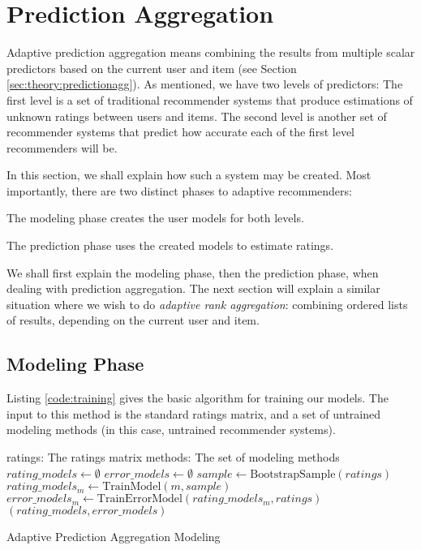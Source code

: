 \section{Prediction Aggregation}

Adaptive prediction aggregation means combining the results
from multiple scalar predictors based on the current user and item
(see Section \ref{sec:theory:predictionagg}).
As mentioned, we have two levels of predictors:
The first level is a set of traditional recommender systems
that produce estimations of unknown ratings between users and items.
The second level is another set of recommender systems 
that predict how accurate each of the first level recommenders will be.

In this section, we shall explain how such a system may be created.
Most importantly, there are two distinct phases to adaptive recommenders:

\begin{enumerate*}
  \item The modeling phase creates the user models for both levels.
  \item The prediction phase uses the created models to estimate ratings.
\end{enumerate*}

We shall first explain the modeling phase, then the prediction phase,
when dealing with prediction aggregation.
The next section will explain a similar situation where
we wish to do \emph{adaptive rank aggregation}: 
combining ordered lists of results, depending on the current user and item.


\subsection{Modeling Phase}

Listing \ref{code:training} gives the basic algorithm for training
our models. The input to this method is the standard ratings matrix,
and a set of untrained modeling methods (in this case,
untrained recommender systems).

\begin{algorithm}
  \begin{algorithmic}[1]
  \REQUIRE ratings: The ratings matrix
  \REQUIRE methods: The set of modeling methods
  \ENSURE
    \STATE $rating\_models \gets \emptyset$
    \STATE $error\_models \gets \emptyset$
      \STATE $sample \gets \mathrm{BootstrapSample}(ratings)$
      \STATE $rating\_models_m \gets \mathrm{TrainModel}(m, sample)$
      \STATE $error\_models_m  \gets \mathrm{TrainErrorModel}(rating\_models_m, ratings)$
    \ENDFOR 
  \RETURN $(rating\_models, error\_models)$
  \end{algorithmic}
  \caption[Adaptive Prediction Aggregation Modeling]{Adaptive Prediction Aggregation Modeling
  }
  \label{code:training}
\end{algorithm}

